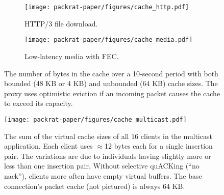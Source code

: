 \begin{figure}[t]
    \centering
    \begin{subfigure}[b]{0.8\linewidth}
        \centering
        \texttt{[image: packrat-paper/figures/cache\_http.pdf]}
        \caption{HTTP/3 file download.
        }
        \label{fig:memory:http}
    \end{subfigure}
    \begin{subfigure}[b]{0.8\linewidth}
        \centering
        \texttt{[image: packrat-paper/figures/cache\_media.pdf]}
        \caption{Low-latency media with FEC.}
        \label{fig:memory:media}
    \end{subfigure}
    \caption{The number of bytes in the cache over a
     10-second period with both bounded (48 KB or 4 KB) and unbounded (64 KB)
     cache sizes. The proxy uses optimistic eviction if an incoming packet
     causes the cache to exceed its capacity.}
    \label{fig:memory}
\end{figure}

\begin{figure}[t]
    \centering
    \texttt{[image: packrat-paper/figures/cache\_multicast.pdf]}
    \caption{The sum of the virtual cache sizes of all $16$ clients in
     the multicast application. Each client uses $\approx\!$12 bytes each for a
     single insertion pair. The variations are due to individuals having
     slightly more or less than one insertion pair. Without selective quACKing
     (``no nack''), clients more often have empty virtual buffers. The base
     connection's packet cache (not pictured) is always 64 KB.}
    \label{fig:memory:multicast}
\end{figure}
